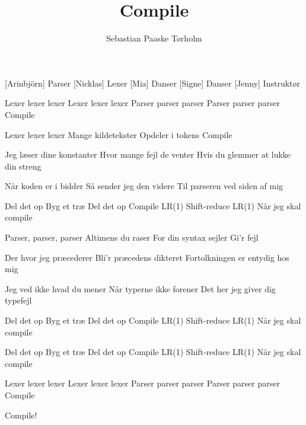 \documentclass[a4paper,11pt]{article}
\title{Compile}
\author{Sebastian Paaske Tørholm}
\begin{document}
\maketitle

\begin{roles}
[Arinbjörn] Parser
[Nicklas] Lexer
[Mia] Danser
[Signe] Danser
[Jenny] Instruktør
\end{roles}

\begin{song}
     {
        Lexer lexer lexer
        Lexer lexer lexer
    }
     {
        Parser parser parser
        Parser parser parser
    }
     {
        Compile
    }

     {
        Lexer lexer lexer
        Mange kildetekster
        Opdeler i tokens
        Compile
    }

     {
        Jeg læser dine konstanter
        Hvor mange fejl de venter
        Hvis du glemmer at lukke din streng
    }

     {
        Når koden er i bidder
        Så sender jeg den videre
        Til parseren ved siden af mig
    }

     {
        Del det op 
        Byg et træ 
        Del det op 
        Compile
        LR(1) 
        Shift-reduce 
        LR(1)
        Når jeg skal compile
    }
    
     {
        Parser, parser, parser
        Altimens du raser
        For din syntax sejler
        Gi’r fejl
    }

     {
        Der hvor jeg præcederer
        Bli’r præcedens dikteret
        Fortolkningen er entydig hos mig
    }

     {
        Jeg ved ikke hvad du mener
        Når typerne ikke forener
        Det her jeg giver dig typefejl
    }

     {
        Del det op 
        Byg et træ 
        Del det op 
        Compile
        LR(1) 
        Shift-reduce 
        LR(1)
        Når jeg skal compile
    }

     {
        Del det op 
        Byg et træ 
        Del det op 
        Compile
        LR(1) 
        Shift-reduce 
        LR(1)
        Når jeg skal compile
    }

     {
        Lexer lexer lexer
        Lexer lexer lexer
    }
     {
        Parser parser parser
        Parser parser parser
    }
     Compile

     {
        Compile!
    }
\end{song}
\end{document}

